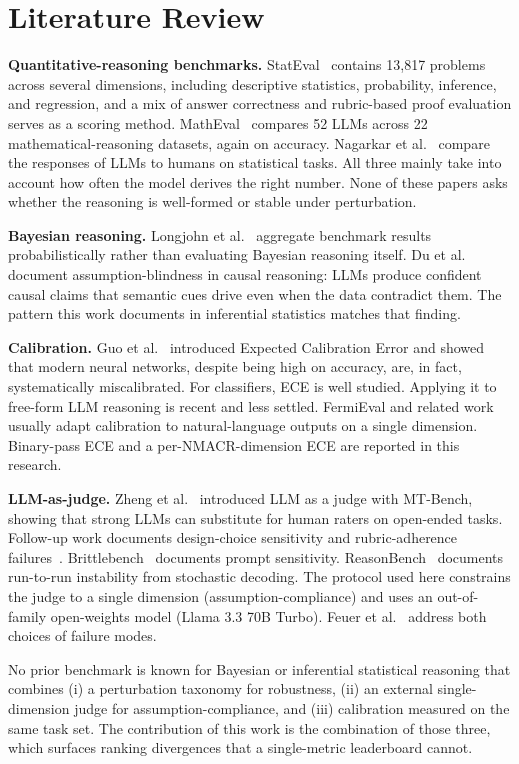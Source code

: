 
\section{Literature Review}
\label{sec:related}

\textbf{Quantitative-reasoning benchmarks.}
StatEval~\cite{lu2025stateval} contains 13{,}817 problems across
several dimensions, including descriptive statistics, probability,
inference, and regression, and a mix of answer correctness and
rubric-based proof evaluation serves as a scoring method.
MathEval~\cite{liu2025matheval} compares 52 LLMs across 22
mathematical-reasoning datasets, again on accuracy. Nagarkar et
al.~\cite{nagarkar2026canllm} compare the responses of LLMs to
humans on statistical tasks. All three mainly take into account how
often the model derives the right number. None of these papers asks
whether the reasoning is well-formed or stable under perturbation.

\textbf{Bayesian reasoning.} Longjohn et
al.~\cite{longjohn2025bayesian} aggregate benchmark results
probabilistically rather than evaluating Bayesian reasoning itself.
Du et al.~\cite{du2025icecream} document assumption-blindness in
causal reasoning: LLMs produce confident causal claims that semantic
cues drive even when the data contradict them. The pattern this work
documents in inferential statistics matches that finding.

\textbf{Calibration.} Guo et al.~\cite{guo2017calibration}
introduced Expected Calibration Error and showed that modern neural
networks, despite being high on accuracy, are, in fact,
systematically miscalibrated. For classifiers, ECE is well studied.
Applying it to free-form LLM reasoning is recent and less settled.
FermiEval and related
work~\cite{fermieval2025,multianswer2026,nagarkar2026canllm} usually
adapt calibration to natural-language outputs on a single dimension.
Binary-pass ECE and a per-NMACR-dimension ECE are reported in this
research.

\textbf{LLM-as-judge.} Zheng et al.~\cite{zheng2023judge} introduced
LLM as a judge with MT-Bench, showing that strong LLMs can
substitute for human raters on open-ended tasks. Follow-up work
documents design-choice sensitivity and rubric-adherence
failures~\cite{park2025judge,judgment2025noise}.
Brittlebench~\cite{brittlebench2026} documents prompt sensitivity.
ReasonBench~\cite{reasonbench2025} documents run-to-run instability
from stochastic decoding. The protocol used here constrains the
judge to a single dimension (assumption-compliance) and uses an
out-of-family open-weights model (Llama 3.3 70B Turbo). Feuer et
al.~\cite{judgment2025noise} address both choices of failure modes.

No prior benchmark is known for Bayesian or inferential statistical
reasoning that combines (i) a perturbation taxonomy for robustness,
(ii) an external single-dimension judge for assumption-compliance,
and (iii) calibration measured on the same task set. The
contribution of this work is the combination of those three, which
surfaces ranking divergences that a single-metric leaderboard
cannot.
